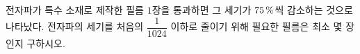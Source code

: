 전자파가 특수 소재로 제작한 필름 $1$장을 통과하면 그 세기가 $75\mkern3mu \%$씩 감소하는 것으로 나타났다. 전자파의 세기를 처음의 $\dfrac{1}{1024}$ 이하로 줄이기 위해 필요한 필름은 최소 몇 장인지 구하시오.
